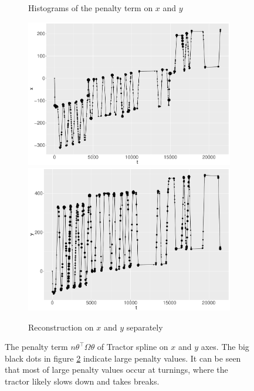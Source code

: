 \begin{figure}
\begin{subfigure}{\textwidth}
    \caption{Histograms of the penalty term on $x$ and $y$}\label{penaltyxyggXYHist}
    \end{subfigure}
    \begin{subfigure}{\textwidth}
    \centering
    \includegraphics[width=0.45\linewidth]{Chapters/02TractorSplineTheory/plot/ggplot/ggRealdataXPenaltyPath.pdf}
    \includegraphics[width=0.45\linewidth]{Chapters/02TractorSplineTheory/plot/ggplot/ggRealdataYPenaltyPath.pdf}
    \caption{Reconstruction on $x$ and $y$ separately}\label{penaltyxyggXYPath}
    \end{subfigure}
 \caption{The penalty term $n\theta^\top\Omega\theta$ of Tractor spline on $x$ and $y$ axes. The big black dots in figure \ref{penaltyxyggXYPath} indicate large penalty values. It can be seen that most of large penalty values occur at turnings, where the tractor likely slows down and takes breaks. }\label{penaltyxygg}
 \end{figure}

